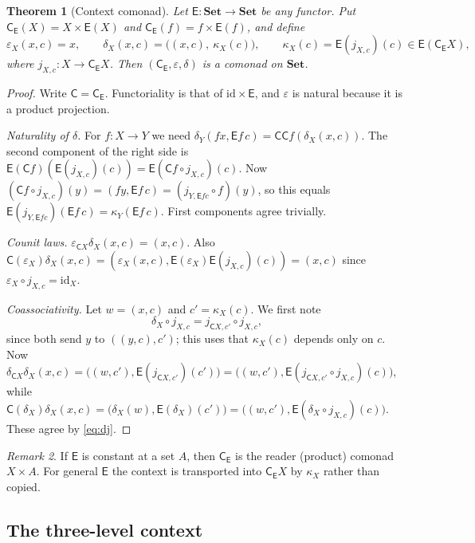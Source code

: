 \documentclass[11pt]{article}
\newtheorem{theorem}{Theorem}[section]
\theoremstyle{definition}
\theoremstyle{remark}
\newtheorem{remark}[theorem]{Remark}
\newcommand{\Set}{\mathbf{Set}}
\newcommand{\C}{\mathsf{C}}
\newcommand{\E}{\mathsf{E}}
\newcommand{\id}{\mathrm{id}}
\begin{document}
\begin{theorem}[Context comonad]\label{thm:context-comonad}
Let $\E\colon\Set\to\Set$ be any functor. Put $\C_\E(X)=X\times\E(X)$ and
$\C_\E(f)=f\times\E(f)$, and define
\[
\varepsilon_X(x,c)=x,\qquad
\delta_X(x,c)=\big((x,c),\ \kappa_X(c)\big),\qquad \kappa_X(c)=\E(j_{X,c})(c)\in\E(\C_\E X),
\]
where $j_{X,c}\colon X\to\C_\E X$. Then $(\C_\E,\varepsilon,\delta)$ is a comonad on $\Set$.
\end{theorem}
\begin{proof}
Write $\C=\C_\E$. Functoriality is that of $\mathrm{id}\times\E$, and $\varepsilon$ is natural
because it is a product projection.

\emph{Naturality of $\delta$.} For $f\colon X\to Y$ we need
$\delta_Y(fx,\E f\,c)=\C\C f(\delta_X(x,c))$. The second component of the right side is
$\E(\C f)(\E(j_{X,c})(c))=\E(\C f\circ j_{X,c})(c)$. Now
$(\C f\circ j_{X,c})(y)=(fy,\E f\,c)=(j_{Y,\E f c}\circ f)(y)$, so this equals
$\E(j_{Y,\E fc})(\E f\,c)=\kappa_Y(\E f\,c)$. First components agree trivially.

\emph{Counit laws.} $\varepsilon_{\C X}\delta_X(x,c)=(x,c)$. Also
$\C(\varepsilon_X)\delta_X(x,c)=(\varepsilon_X(x,c),\E(\varepsilon_X)\E(j_{X,c})(c))=(x,c)$ since
$\varepsilon_X\circ j_{X,c}=\id_X$.

\emph{Coassociativity.} Let $w=(x,c)$ and $c'=\kappa_X(c)$. We first note
\begin{equation}\label{eq:dj}
\delta_X\circ j_{X,c}=j_{\C X,c'}\circ j_{X,c},
\end{equation}
since both send $y$ to $((y,c),c')$; this uses that $\kappa_X(c)$ depends only on $c$. Now
$\delta_{\C X}\delta_X(x,c)=\big((w,c'),\E(j_{\C X,c'})(c')\big)
=\big((w,c'),\E(j_{\C X,c'}\circ j_{X,c})(c)\big)$, while
$\C(\delta_X)\delta_X(x,c)=\big(\delta_X(w),\E(\delta_X)(c')\big)
=\big((w,c'),\E(\delta_X\circ j_{X,c})(c)\big)$. These agree by \eqref{eq:dj}.
\end{proof}

\begin{remark}
If $\E$ is constant at a set $A$, then $\C_\E$ is the reader (product) comonad $X\times A$. For general
$\E$ the context is transported into $\C_\E X$ by $\kappa_X$ rather than copied.
\end{remark}

\subsection{The three-level context}
\end{document}
